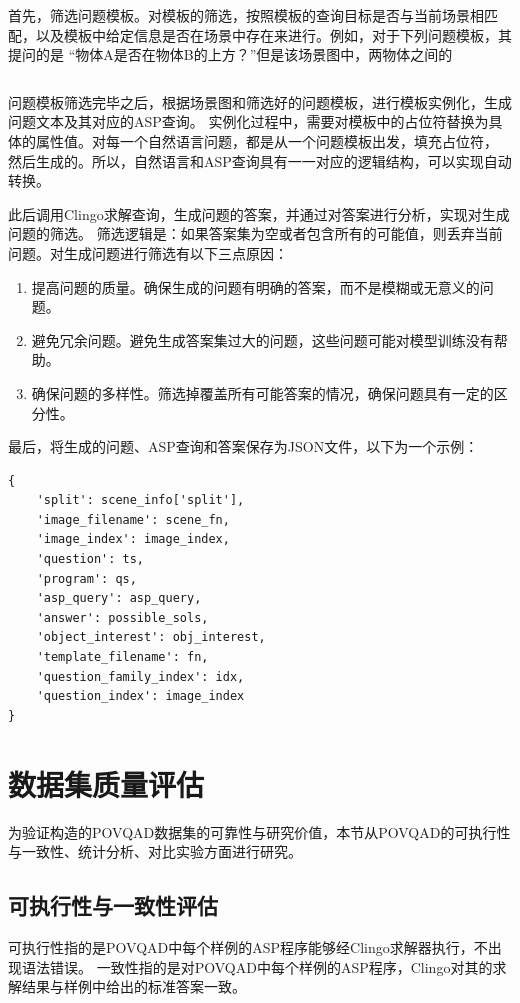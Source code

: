 首先，筛选问题模板。对模板的筛选，按照模板的查询目标是否与当前场景相匹配，以及模板中给定信息是否在场景中存在来进行。例如，对于下列问题模板，其提问的是
“物体A是否在物体B的上方？”但是该场景图中，两物体之间的
\begin{lstlisting}

\end{lstlisting}

问题模板筛选完毕之后，根据场景图和筛选好的问题模板，进行模板实例化，生成问题文本及其对应的ASP查询。
实例化过程中，需要对模板中的占位符替换为具体的属性值。对每一个自然语言问题，都是从一个问题模板出发，填充占位符，
然后生成的。所以，自然语言和ASP查询具有一一对应的逻辑结构，可以实现自动转换。

此后调用Clingo求解查询，生成问题的答案，并通过对答案进行分析，实现对生成问题的筛选。
筛选逻辑是：如果答案集为空或者包含所有的可能值，则丢弃当前问题。对生成问题进行筛选有以下三点原因：
\begin{enumerate}[nosep]
\item 提高问题的质量。确保生成的问题有明确的答案，而不是模糊或无意义的问题。
\item 避免冗余问题。避免生成答案集过大的问题，这些问题可能对模型训练没有帮助。
\item 确保问题的多样性。筛选掉覆盖所有可能答案的情况，确保问题具有一定的区分性。
\end{enumerate}

最后，将生成的问题、ASP查询和答案保存为JSON文件，以下为一个示例：
\begin{lstlisting}
{
    'split': scene_info['split'],
    'image_filename': scene_fn,
    'image_index': image_index,
    'question': ts,
    'program': qs,
    'asp_query': asp_query,
    'answer': possible_sols,
    'object_interest': obj_interest,
    'template_filename': fn,
    'question_family_index': idx,
    'question_index': image_index
}
\end{lstlisting}

\section{数据集质量评估}
为验证构造的POVQAD数据集的可靠性与研究价值，本节从POVQAD的可执行性与一致性、统计分析、对比实验方面进行研究。
\subsection{可执行性与一致性评估}
可执行性指的是POVQAD中每个样例的ASP程序能够经Clingo求解器执行，不出现语法错误。
一致性指的是对POVQAD中每个样例的ASP程序，Clingo对其的求解结果与样例中给出的标准答案一致。

